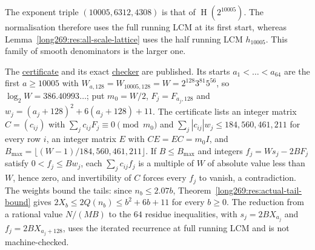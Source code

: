 \documentclass[11pt]{article}
\theoremstyle{remark}
\theoremstyle{plain}
\newcommand{\hgt}{\operatorname{H}}
\begin{document}
The exponent triple $(10005,6312,4308)$ is that of $\hgt(2^{10005})$.
The normalisation therefore uses the full running LCM at its first
start, whereas Lemma~\ref{long269:res:all-scale-lattice} uses the half
running LCM $h_{10005}$.  This family of smooth denominators is the
larger one.

The
\href{https://github.com/wcook04/plectis-erdos/blob/f757115e03bebe5c04431a147da559015c680a37/research/experiments/erdos269/large-computations/regenerated/block_certificate.json}{certificate}
and its exact
\href{https://github.com/wcook04/plectis-erdos/blob/f757115e03bebe5c04431a147da559015c680a37/research/experiments/erdos269/large-computations/verify_recovered.py}{checker}
are published.  Its starts $a_1<\dots<a_{64}$ are the first $a\ge10005$
with $W_{a,128}=W_{10005,128}=W=2^{128}3^{81}5^{56}$, so
$\log_2W=386.40993\ldots$; put $m_0=W/2$, $F_j=F_{a_j,128}$ and
$w_j=(a_j+128)^2+6(a_j+128)+11$.  The certificate lists an integer
matrix $C=(c_{ij})$ with $\sum_jc_{ij}F_j\equiv0\pmod{m_0}$ and
$\sum_j|c_{ij}|w_j\le184{,}560{,}461{,}211$ for every row $i$, an
integer matrix $E$ with $CE=EC=m_0I$, and
$B_{\max}=\lfloor(W-1)/184{,}560{,}461{,}211\rfloor$.  If
$B\le B_{\max}$ and integers $f_j=Ws_j-2BF_j$ satisfy $0<f_j\le Bw_j$,
each $\sum_jc_{ij}f_j$ is a multiple of $W$ of absolute value less than
$W$, hence zero, and invertibility of $C$ forces every $f_j$ to vanish,
a contradiction.  The weights bound the tails: since $n_b\le2.07b$,
Theorem~\ref{long269:res:actual-tail-bound} gives
$2X_b\le2Q(n_b)\le b^2+6b+11$ for every $b\ge0$.  The reduction from a
rational value $N/(MB)$ to the $64$ residue inequalities, with
$s_j=2BX_{a_j}$ and $f_j=2BX_{a_j+128}$, uses the iterated recurrence at full
running LCM and is not machine-checked.
\end{document}
